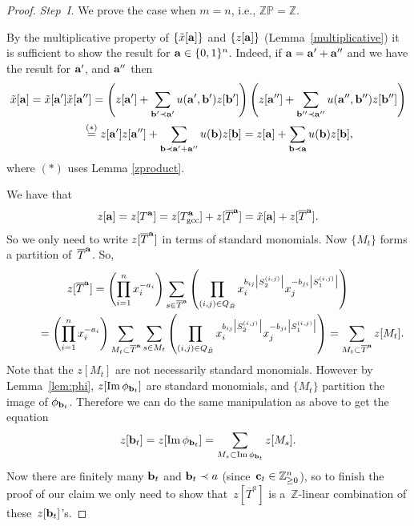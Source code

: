 \documentclass[pdftex]{sigma}
\numberwithin{equation}{section}
\DeclareMathOperator{\Ima}{Im}
\begin{document}
\begin{proof}
\emph{Step~I.} We prove the case when $m=n$, i.e., $\mathbb{ZP}=\mathbb{Z}$.

By the multiplicative property of $\{\tilde{x}[{\bf a}]\}$ and $\{z[{\bf a}]\}$ (Lemma~\ref{multiplicative}) it is suf\/f\/icient to show the result for ${\bf a}\in \{0,1\}^n$.
Indeed, if ${\bf a}={\bf a}'+{\bf a}''$ and we have the result for ${\bf a}'$, and ${\bf a}''$ then{\samepage
\begin{gather*}
\tilde{x}[{\bf a}] =\tilde{x}[{\bf a}']\tilde{x}[{\bf a}'']
 =\left(z[{\bf a}']+\sum_{{\bf b}'\prec {\bf a}'} u({\bf a}',{\bf b}') z[{\bf b}']\right)\left(z[{\bf a}'']+\sum_{{\bf b}''\prec {\bf a}''} u({\bf a}'',{\bf b}'') z[{\bf b}'']\right)\\
\hphantom{\tilde{x}[{\bf a}]}{}
\stackrel{(*)}{=}z[{\bf a}']z[{\bf a}'']  +\sum_{{\bf b}\prec {\bf a}'+{\bf a}''} u({\bf b}) z[{\bf b}]
 = z[{\bf a}] +\sum_{{\bf b}\prec {\bf a}} u({\bf b}) z[{\bf b}],
\end{gather*}
where $(*)$ uses Lemma \ref{zproduct}.}



We have that
\begin{gather*}
z[{\bf a}]=z[T^{\bf a}]=z[T^{\bf a}_{\rm gcc}]+z[\overline{T}^{\bf a}]=\tilde{x}[{\bf a}]+z[\overline{T}^{\bf a}].
\end{gather*}
So we only need to write $z[\overline{T}^{\bf a}]$ in terms of standard monomials.
Now $\{M_t\}$ forms a partition of~$\overline{T}^{\bf a}$. So,
\begin{gather*}
z[\overline{T}^{\bf a}] = \left(\prod_{i=1}^n  x_i^{-a_i}\right)
\sum_{s \in \overline{T}^{\bf a}} \left(\prod_{(i,j)\in Q_{\tilde B}}  x_{i}^{b_{ij}\big|S^{(i,j)}_2\big|} x_{j}^{-b_{ji}\big|S^{(i,j)}_1\big|}\right)   \\
\hphantom{z[\overline{T}^{\bf a}]}{}
= \left(\prod_{i=1}^n  x_i^{-a_i}\right) \sum_{M_t \subset \overline{T}^{\bf a}} \sum_{s \in M_t} \left(\prod_{(i,j)\in Q_{\tilde B}}  x_{i}^{b_{ij}\big|S^{(i,j)}_2\big|} x_{j}^{-b_{ji}\big|S^{(i,j)}_1\big|}\right)
 = \sum_{ M_t \subset \overline{T}^{\bf a}} z[M_t].
\end{gather*}
Note that the $z[M_t]$ are not necessarily standard monomials. However by Lemma~\ref{lem:phi}, $z[\Ima \phi_{{\bf b}_t}]$ are standard monomials, and $\{M_t\}$ partition the image of $\phi_{{\bf b}_t}$. Therefore we can do the same manipulation as above to get the equation
\begin{gather}\label{zbt}
z[{\bf b}_t] = z[\Ima \phi_{{\bf b}_t}]=\sum_{ M_s \subset \Ima \phi_{{\bf b}_t}} z[M_s] .
\end{gather}
Now there are f\/initely many ${\bf b}_t$ and ${\bf b}_t \prec a$ (since~${\bf c}_t \in \mathbb{Z}^n_{\geq 0}$), so to f\/inish the proof of our claim we only need to show that~$z[\overline{T}^a]$ is a~$\mathbb{Z}$-linear combination of  these~$z[{\bf b}_t]$'s.


\end{proof}
\end{document}
